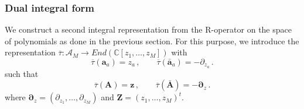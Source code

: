 \documentclass[11pt]{article}
\numberwithin{equation}{section}
\newcommand{\oa}{\mathbf{a}}
\newcommand{\oad}{\mathbf{\bar{a}}}
\newcommand{\OA}{\mathbf{A}}
\newcommand{\OAD}{\mathbf{\bar{A}}}
\newcommand{\M}{M}
\newcommand{\heat}{z}
\newcommand{\Heat}{Z}
\newcommand{\dualrep}{\overline{\tau}}
\begin{document}
\subsubsection{Dual integral form}\label{Heat-RDensity}
 We construct a second integral representation from the R-operator on the space of polynomials as done in the previous section.
For this purpose, we introduce the representation $\dualrep:\mathcal{A}_M\to End(\mathbb{C}[\heat_1,\ldots,\heat_M])$ with
\begin{equation}\label{rep-infiniteDim-Poly_dual}
\dualrep(\oa_{a})=\heat_a\,,\qquad \dualrep(\oad_{a})=-\partial_{\heat_{a}}\,.
	\end{equation}
	such that
	\begin{equation}\label{rep-infiniteDim-Poly2_dual}
\dualrep(\OA)=\bm{\heat}\,,\qquad \dualrep(\OAD)=-\bm{\partial}_\heat\,.
	\end{equation}
	where  $\bm{\partial}_\heat=(\partial_{\heat_1},\ldots,\partial_{\heat_\M})$ and $\bm{\Heat}=(\heat_{1},\ldots,\heat_{\M})^{t}$.
\end{document}
